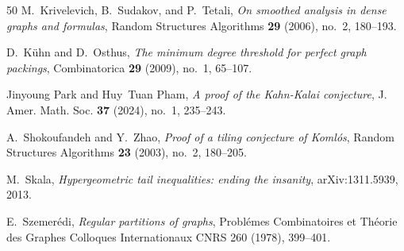 \documentclass[reqno, 12pt]{amsart}
\numberwithin{equation}{section}
\numberwithin{figure}{section}
\theoremstyle{plain}
\theoremstyle{definition}
\begin{document}
\begin{thebibliography}{50}
M.~Krivelevich, B.~Sudakov, and P.~Tetali, \emph{On smoothed analysis in dense graphs and formulas}, Random Structures Algorithms \textbf{29} (2006), no.~2, 180--193. 

D.~K\"{u}hn and D.~Osthus, \emph{The minimum degree threshold for perfect graph packings}, Combinatorica \textbf{29} (2009), no.~1, 65--107. 

Jinyoung Park and Huy~Tuan Pham, \emph{A proof of the {K}ahn-{K}alai conjecture}, J. Amer. Math. Soc. \textbf{37} (2024), no.~1, 235--243. 

A.~Shokoufandeh and Y.~Zhao, \emph{Proof of a tiling conjecture of {K}oml\'{o}s}, Random Structures Algorithms \textbf{23} (2003), no.~2, 180--205. 

M.~Skala, \emph{Hypergeometric tail inequalities: ending the insanity}, arXiv:1311.5939, 2013.

E.~Szemerédi, \emph{Regular partitions of graphs}, {P}robl\'{e}mes {C}ombinatoires et {T}h\'{e}orie des {G}raphes {C}olloques {I}nternationaux {CNRS} 260 (1978), 399--401.

\end{thebibliography}
\end{document}
